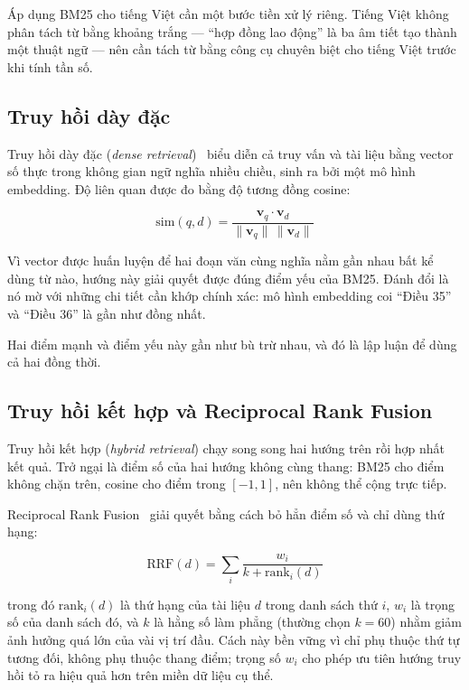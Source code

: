 \documentclass[12pt,a4paper]{report}
\numberwithin{equation}{chapter}
\numberwithin{figure}{chapter}
\numberwithin{table}{chapter}
\begin{document}
Áp dụng BM25 cho tiếng Việt cần một bước tiền xử lý riêng. Tiếng Việt không phân
tách từ bằng khoảng trắng --- ``hợp đồng lao động'' là ba âm tiết tạo thành một
thuật ngữ --- nên cần tách từ bằng công cụ chuyên biệt cho tiếng Việt trước khi
tính tần số.

\subsection{Truy hồi dày đặc}
Truy hồi dày đặc (\textit{dense retrieval})~\cite{karpukhin2020dpr} biểu diễn cả
truy vấn và tài liệu bằng vector số thực trong không gian ngữ nghĩa nhiều chiều,
sinh ra bởi một mô hình embedding. Độ liên quan được đo bằng độ tương đồng
cosine:

\begin{equation}
\label{eq:cosine}
\mathrm{sim}(q, d) = \frac{\mathbf{v}_q \cdot \mathbf{v}_d}
                          {\lVert \mathbf{v}_q \rVert \, \lVert \mathbf{v}_d \rVert}
\end{equation}

Vì vector được huấn luyện để hai đoạn văn cùng nghĩa nằm gần nhau bất kể dùng từ
nào, hướng này giải quyết được đúng điểm yếu của BM25. Đánh đổi là nó mờ với
những chi tiết cần khớp chính xác: mô hình embedding coi ``Điều 35'' và ``Điều
36'' là gần như đồng nhất.

Hai điểm mạnh và điểm yếu này gần như bù trừ nhau, và đó là lập luận để dùng cả
hai đồng thời.

\subsection{Truy hồi kết hợp và Reciprocal Rank Fusion}
Truy hồi kết hợp (\textit{hybrid retrieval}) chạy song song hai hướng trên rồi
hợp nhất kết quả. Trở ngại là điểm số của hai hướng không cùng thang: BM25 cho
điểm không chặn trên, cosine cho điểm trong $[-1, 1]$, nên không thể cộng trực
tiếp.

Reciprocal Rank Fusion~\cite{cormack2009rrf} giải quyết bằng cách bỏ hẳn điểm số
và chỉ dùng thứ hạng:

\begin{equation}
\label{eq:rrf}
\mathrm{RRF}(d) = \sum_{i} \frac{w_i}{k + \mathrm{rank}_i(d)}
\end{equation}

trong đó $\mathrm{rank}_i(d)$ là thứ hạng của tài liệu $d$ trong danh sách thứ
$i$, $w_i$ là trọng số của danh sách đó, và $k$ là hằng số làm phẳng (thường
chọn $k = 60$) nhằm giảm ảnh hưởng quá lớn của vài vị trí đầu. Cách này bền vững
vì chỉ phụ thuộc thứ tự tương đối, không phụ thuộc thang điểm; trọng số $w_i$ cho
phép ưu tiên hướng truy hồi tỏ ra hiệu quả hơn trên miền dữ liệu cụ thể.
\end{document}
